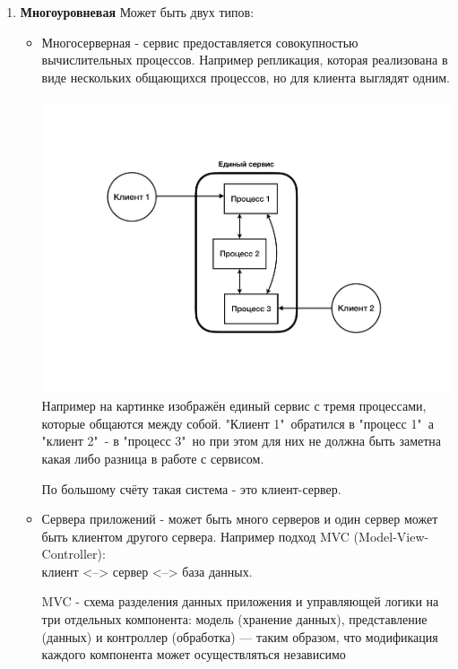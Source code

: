 \begin{enumerate}
\item \textbf{ Многоуровневая}
Может быть двух типов:
\begin{itemize}
\item
Многосерверная - сервис предоставляется совокупностью вычислительных процессов. Например репликация, которая реализована в виде нескольких общающихся процессов, но для клиента выглядят одним.\\
\\
\includegraphics[scale=0.7]{16/MultiSerrver.pdf}
\\
Например на картинке изображён единый сервис с тремя процессами, которые общаются между собой. "Клиент 1"\ обратился в "процесс 1"\, а "клиент 2"\ - в "процесс 3"\, но при этом для них не должна быть заметна какая либо разница в работе с сервисом.

По большому счёту такая система - это клиент-сервер.

\item
Сервера приложений - может быть много серверов и один сервер может быть клиентом другого сервера.
Например подход MVC (Model-View-Controller): \\клиент <--> сервер <--> база данных.

MVC - схема разделения данных приложения и управляющей логики на три отдельных компонента: модель (хранение данных), представление (данных) и контроллер (обработка) — таким образом, что модификация каждого компонента может осуществляться независимо


\end{itemize}
\end{enumerate}
